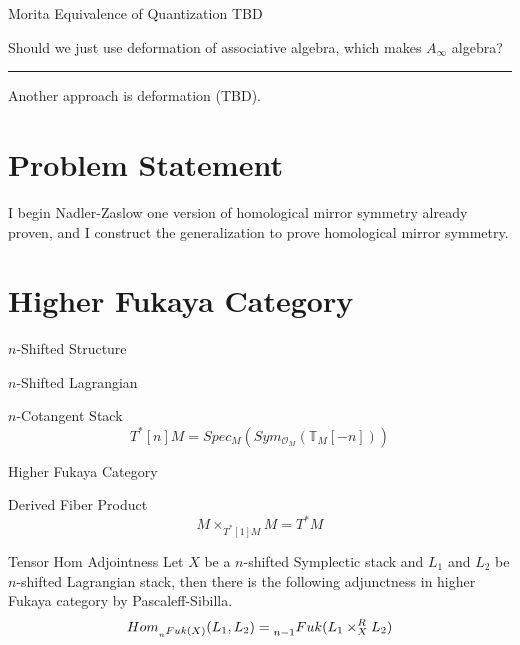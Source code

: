 \documentclass{article}
\begin{document}
\begin{definition}{Morita Equivalence of Quantization}{}
TBD
\end{definition}


\begin{question}{}{}
Should we just use deformation of associative algebra, which makes $A_\infty$ algebra?
\end{question}



\vspace{0.5cm}
\noindent\rule{\textwidth}{0.4pt}
\vspace{0.5cm}


Another approach is deformation (TBD). 





\section{Problem Statement}

I begin Nadler-Zaslow one version of homological mirror symmetry already proven, 
and I construct the generalization to prove homological mirror symmetry.

\section{Higher Fukaya Category}

\begin{definition}{$n$-Shifted Structure}{}
\end{definition}


\begin{definition}{$n$-Shifted Lagrangian}{}
\end{definition}


\begin{definition}{$n$-Cotangent Stack}{}
\[ T^* [n]M = Spec_M (Sym_{\mathcal{O}_M} (\mathbb{T}_M [-n])) \]
\end{definition}


\begin{definition}{Higher Fukaya Category}{}
\end{definition}


\begin{proposition}{Derived Fiber Product}{}
\[ M\times_{T^* [1]M} M = T^* M \]
\end{proposition}


\begin{definition}{Tensor Hom Adjointness}{}
Let $X$ be a $n$-shifted Symplectic stack and $L_1$ and $L_2$ be $n$-shifted Lagrangian stack,
then there is the following adjunctness in higher Fukaya category by Pascaleff-Sibilla. \\
\[ Hom_{\prescript{}{n}{Fuk(X)}} (L_1, L_2) = \prescript{}{n-1}{Fuk(L_1 \times_X^R L_2)}\]
\end{definition}
\end{document}
